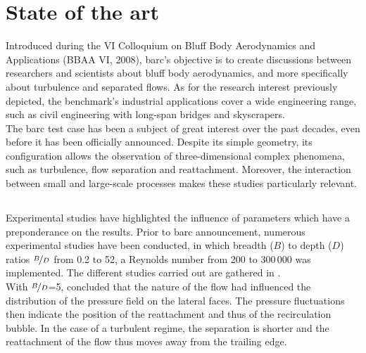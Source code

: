 \documentclass[12pt,twoside]{report}
\begin{document}




\clearpage

\chapter{State of the art} \label{ch:state_of_the_art}

% 
Introduced during the VI Colloquium on Bluff Body Aerodynamics and Applications (BBAA VI, 2008), \gls{barc}'s objective is to create discussions between researchers and scientists about bluff body aerodynamics, and more specifically about turbulence and separated flows. As for the research interest previously depicted, the benchmark's industrial applications cover a wide engineering range, such as civil engineering with long-span bridges and skyscrapers. \\

The \gls{barc} test case has been a subject of great interest over the past decades, even before it has been officially announced. Despite its simple geometry, its configuration allows the observation of three-dimensional complex phenomena, such as turbulence, flow separation and reattachment. Moreover, the interaction between small and large-scale processes makes these studies particularly relevant. \\




\section{}

Experimental studies have highlighted the influence of parameters which have a preponderance on the results. Prior to \gls{barc} announcement, numerous experimental studies have been conducted, in which breadth ($B$) to depth ($D$) ratios $\nicefrac{B}{D}$ from 0.2 to 52, a Reynolds number from 200 to 300\,000 was implemented. The different studies carried out are gathered in \cite{bruno_benchmark_2014}. \\

With $\nicefrac{B}{D}$=5, \cite{ricciardelli_sectional_2008} concluded that the nature of the flow had influenced the distribution of the pressure field on the lateral faces. The pressure fluctuations then indicate the position of the reattachment and thus of the recirculation bubble. In the case of a turbulent regime, the separation is shorter and the reattachment of the flow thus moves away from the trailing edge.
\end{document}
